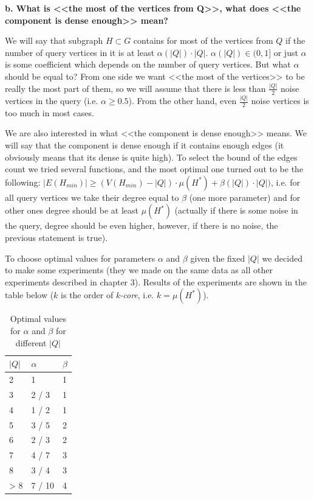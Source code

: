 \textbf{b. What is <<the most of the vertices from Q>>, what does <<the component is dense enough>> mean?}

We will say that subgraph $H \subset G$ contains for most of the vertices from $Q$ if the number of query vertices in it is at least $\alpha(|Q|) \cdot |Q|$. $\alpha(|Q|) \in (0, 1]$ or just $\alpha$ is some coefficient which depends on the number of query vertices. But what $\alpha$ should be equal to? From one side we want <<the most of the vertices>> to be really the most part of them, so we will assume that there is less than $\frac{|Q|}{2}$ noise vertices in the query (i.e. $\alpha \ge 0.5$). From the other hand, even $\frac{|Q|}{2}$ noise vertices is too much in most cases.

We are also interested in what <<the component is dense enough>> means. We will say that the component is dense enough if it contains enough edges (it obviously means that its dense is quite high). To select the bound of the edges count we tried several functions, and the most optimal one turned out to be the following: $|E(H_{min})| \ge (V(H_{min}) - |Q|) \cdot \mu(H^*) + \beta(|Q|) \cdot |Q|)$, i.e. for all query vertices we take their degree equal to $\beta$ (one more parameter) and for other ones degree should be at least $\mu(H^*)$ (actually if there is some noise in the query, degree should be even higher, however, if there is no noise, the previous statement is true).

To choose optimal values for parameters $\alpha$ and $\beta$ given the fixed $|Q|$ we decided to make some experiments (they we made on the same data as all other experiments described in chapter $3$). Results of the experiments are shown in the table below ($k$ is the order of \textit{k-core}, i.e. $k = \mu(H^*)$).

\begin{table}[!h]
\centering
\caption{Optimal values for $\alpha$ and $\beta$ for different $|Q|$}\label{parameters-research}
  \begin{tabular}{| l | l | p{1cm} |}
  \hline
  $|Q|$ & $\alpha$ & $\beta$ \\\hline
  2   & 1      & 1        \\\hline
  3   & 2 / 3  & 1        \\\hline
  4   & 1 / 2  & 1        \\\hline
  5   & 3 / 5  & 2        \\\hline
  6   & 2 / 3  & 2        \\\hline
  7   & 4 / 7  & 3        \\\hline
  8   & 3 / 4  & 3        \\\hline
  > 8 & 7 / 10 & 4        \\\hline
  \end{tabular}
\end{table}
\FloatBarrier

